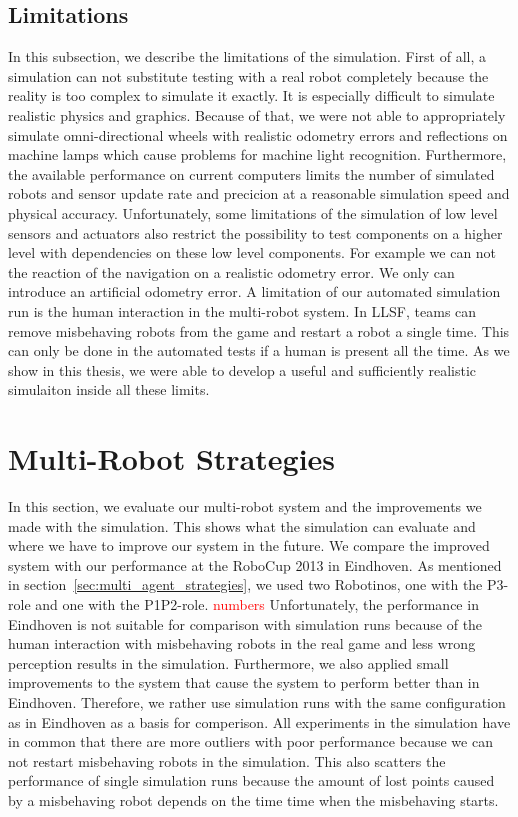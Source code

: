\subsection{Limitations}
In this subsection, we describe the limitations of the simulation. First of all, a simulation can not substitute testing with a real robot completely because the reality is too complex to simulate it exactly. It is especially difficult to simulate realistic physics and graphics. Because of that, we were not able to appropriately simulate omni-directional wheels with realistic odometry errors and reflections on machine lamps which cause problems for machine light recognition. Furthermore, the available performance on current computers limits the number of simulated robots and sensor update rate and precicion at a reasonable simulation speed and physical accuracy. Unfortunately, some limitations of the simulation of low level sensors and actuators also restrict the possibility to test components on a higher level with dependencies on these low level components. For example we can not the reaction of the navigation on a realistic odometry error. We only can introduce an artificial odometry error. A limitation of our automated simulation run is the human interaction in the multi-robot system. In LLSF, teams can remove misbehaving robots from the game and restart a robot a single time. This can only be done in the automated tests if a human is present all the time. As we show in this thesis, we were able to develop a useful and sufficiently realistic simulaiton inside all these limits.\\

\section{Multi-Robot Strategies}
\label{sec:multi_robot_strategies}
In this section, we evaluate our multi-robot system and the improvements we made with the simulation. This shows what the simulation can evaluate and where we have to improve our system in the future. We compare the improved system with our performance at the RoboCup 2013 in Eindhoven. As mentioned in section~\ref{sec:multi_agent_strategies}, we used two Robotinos, one with the P3-role and one with the P1P2-role. \textcolor{red}{numbers} Unfortunately, the performance in Eindhoven is not suitable for comparison with simulation runs because of the human interaction with misbehaving robots in the real game and less wrong perception results in the simulation. Furthermore, we also applied small improvements to the system that cause the system to perform better than in Eindhoven. Therefore, we rather use simulation runs with the same configuration as in Eindhoven as a basis for comperison. All experiments in the simulation have in common that there are more outliers with poor performance because we can not restart misbehaving robots in the simulation. This also scatters the performance of single simulation runs because the amount of lost points caused by a misbehaving robot depends on the time time when the misbehaving starts.











